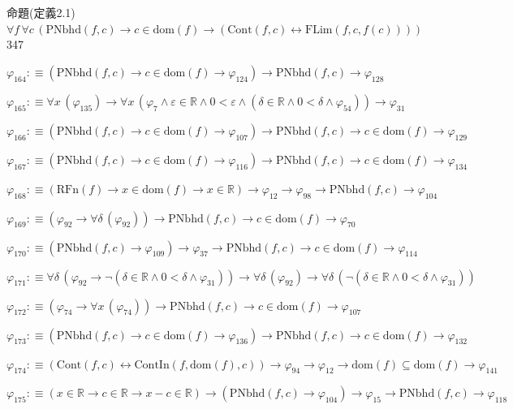 \begin{fullproof}{命題(定義2.1)}{$\forall f\,\forall c\,(\mathrm{PNbhd}(f,c) \to c \in \mathrm{dom}(f) \to (\mathrm{Cont}(f,c) \leftrightarrow \mathrm{FLim}(f,c,f(c))))$}{347}
\begin{abbrevlist}
\item $\varphi_{164} :\equiv (\mathrm{PNbhd}(f,c) \to c \in \mathrm{dom}(f) \to \varphi_{124}) \to \mathrm{PNbhd}(f,c) \to \varphi_{128}$
\item $\varphi_{165} :\equiv \forall x\,(\varphi_{135}) \to \forall x\,(\varphi_{7} \land \varepsilon \in \mathbb{R} \land 0 < \varepsilon \land (\delta \in \mathbb{R} \land 0 < \delta \land \varphi_{54})) \to \varphi_{31}$
\item $\varphi_{166} :\equiv (\mathrm{PNbhd}(f,c) \to c \in \mathrm{dom}(f) \to \varphi_{107}) \to \mathrm{PNbhd}(f,c) \to c \in \mathrm{dom}(f) \to \varphi_{129}$
\item $\varphi_{167} :\equiv (\mathrm{PNbhd}(f,c) \to c \in \mathrm{dom}(f) \to \varphi_{116}) \to \mathrm{PNbhd}(f,c) \to c \in \mathrm{dom}(f) \to \varphi_{134}$
\item $\varphi_{168} :\equiv (\mathrm{RFn}(f) \to x \in \mathrm{dom}(f) \to x \in \mathbb{R}) \to \varphi_{12} \to \varphi_{98} \to \mathrm{PNbhd}(f,c) \to \varphi_{104}$
\item $\varphi_{169} :\equiv (\varphi_{92} \to \forall \delta\,(\varphi_{92})) \to \mathrm{PNbhd}(f,c) \to c \in \mathrm{dom}(f) \to \varphi_{70}$
\item $\varphi_{170} :\equiv (\mathrm{PNbhd}(f,c) \to \varphi_{109}) \to \varphi_{37} \to \mathrm{PNbhd}(f,c) \to c \in \mathrm{dom}(f) \to \varphi_{114}$
\item $\varphi_{171} :\equiv \forall \delta\,(\varphi_{92} \to \neg (\delta \in \mathbb{R} \land 0 < \delta \land \varphi_{31})) \to \forall \delta\,(\varphi_{92}) \to \forall \delta\,(\neg (\delta \in \mathbb{R} \land 0 < \delta \land \varphi_{31}))$
\item $\varphi_{172} :\equiv (\varphi_{74} \to \forall x\,(\varphi_{74})) \to \mathrm{PNbhd}(f,c) \to c \in \mathrm{dom}(f) \to \varphi_{107}$
\item $\varphi_{173} :\equiv (\mathrm{PNbhd}(f,c) \to c \in \mathrm{dom}(f) \to \varphi_{136}) \to \mathrm{PNbhd}(f,c) \to c \in \mathrm{dom}(f) \to \varphi_{132}$
\item $\varphi_{174} :\equiv (\mathrm{Cont}(f,c) \leftrightarrow \mathrm{ContIn}(f,\mathrm{dom}(f),c)) \to \varphi_{94} \to \varphi_{12} \to \mathrm{dom}(f) \subseteq \mathrm{dom}(f) \to \varphi_{141}$
\item $\varphi_{175} :\equiv (x \in \mathbb{R} \to c \in \mathbb{R} \to x - c \in \mathbb{R}) \to (\mathrm{PNbhd}(f,c) \to \varphi_{104}) \to \varphi_{15} \to \mathrm{PNbhd}(f,c) \to \varphi_{118}$

\end{abbrevlist}
\end{fullproof}
